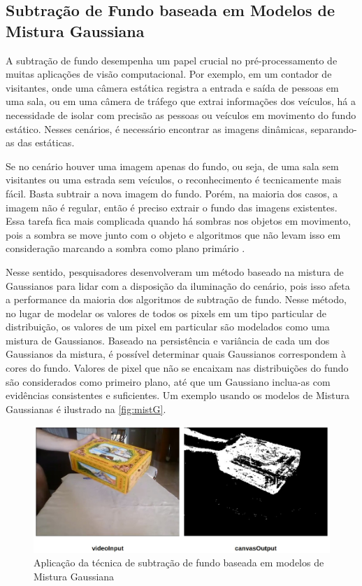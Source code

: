 \documentclass[12pt, %
openright, 
oneside, %
a4paper,    %
brazil]{facom-ufu-abntex2}
\begin{document}
\subsection{Subtração de Fundo baseada em Modelos de Mistura Gaussiana}

A subtração de fundo desempenha um papel crucial no pré-processamento de muitas
aplicações de visão computacional. Por exemplo, em um contador de visitantes,
onde uma câmera estática registra a entrada e saída de pessoas em uma sala, ou
em uma câmera de tráfego que extrai informações dos veículos, há a necessidade
de isolar com precisão as pessoas ou veículos em movimento do fundo estático.
Nesses cenários, é necessário encontrar as imagens dinâmicas, separando-as das
estáticas.

Se no cenário houver uma imagem apenas do fundo, ou seja, de uma sala sem
visitantes ou uma estrada sem veículos, o reconhecimento é tecnicamente mais
fácil. Basta subtrair a nova imagem do fundo. Porém, na maioria dos casos, a
imagem não é regular, então é preciso extrair o fundo das imagens existentes.
Essa tarefa fica mais complicada quando há sombras nos objetos em movimento,
pois a sombra se move junto com o objeto e algoritmos que não levam isso em
consideração marcando a sombra como plano primário \cite{opencv_bgsubtraction}.

Nesse sentido, pesquisadores desenvolveram um método baseado na mistura de
Gaussianos para lidar com a disposição da iluminação do cenário, pois isso
afeta a performance da maioria dos algoritmos de subtração de fundo. Nesse
método, no lugar de modelar os valores de todos os pixels em um tipo particular
de distribuição, os valores de um pixel em particular são modelados como uma
mistura de Gaussianos. Baseado na persistência e variância de cada um dos
Gaussianos da mistura, é possível determinar quais Gaussianos correspondem à
cores do fundo. Valores de pixel que não se encaixam nas distribuições do fundo
são considerados como primeiro plano, até que um Gaussiano inclua-as com
evidências consistentes e suficientes. Um exemplo usando os modelos de Mistura
Gaussianas é ilustrado na \autoref{fig:mistG}.

\begin{figure}[ht]
	\centering
	\includegraphics[width=0.7\linewidth]{background_subtraction.jpeg}
	\caption{Aplicação da técnica de subtração de fundo baseada em modelos
		de Mistura Gaussiana}

	\label{fig:mistG}
\end{figure}
\end{document}
